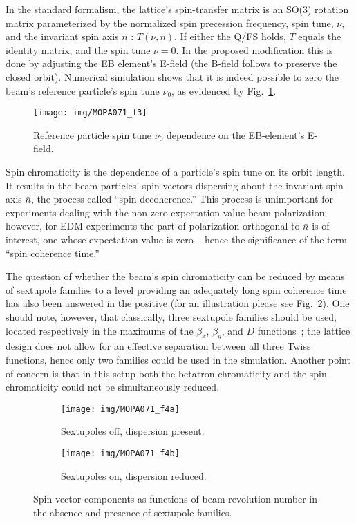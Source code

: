 \documentclass[a4paper]{jacow}
\newcommand{\barn}{\bar n}
\begin{document}
In the standard formalism, the lattice's spin-transfer matrix is an SO(3) rotation matrix parameterized by the normalized spin precession frequency, spin tune, $\nu$, and the invariant spin axis $\barn$ : $T(\nu, \barn)$. If either the Q/FS holds, $T$ equals the identity matrix, and the spin tune $\nu=0$. In the proposed modification this is done by adjusting the EB element's E-field (the B-field follows to preserve the closed orbit). Numerical simulation shows that it is indeed possible to zero the beam's reference particle's spin tune $\nu_0$, as evidenced by Fig.~\ref{fig:nu-vs-EBE}.

\begin{figure}[h]
	\texttt{[image: img/MOPA071\_f3]}
	\caption{Reference particle spin tune $\nu_0$ dependence on the EB-element's E-field.\label{fig:nu-vs-EBE}}
\end{figure}

Spin chromaticity is the dependence of a particle's spin tune on its orbit length. It results in the beam particles' spin-vectors dispersing about the invariant spin axis $\barn$, the process called ``spin decoherence.'' This process is unimportant for experiments dealing with the non-zero expectation value beam polarization; however, for EDM experiments the part of polarization orthogonal to $\barn$ is of interest, one whose expectation value is zero -- hence the significance of the term ``spin coherence time.''

The question of whether the beam's spin chromaticity can be reduced by means of sextupole families to a level providing an adequately long spin coherence time has also been answered in the positive (for an illustration please see Fig.~\ref{fig:spin-on-sext}). One should note, however, that classically, three sextupole families should be used, located respectively in the maximums of the $\beta_x$, $\beta_y$, and $D$ functions~\cite{Decoherence-main};  the lattice design does not allow for an effective separation between all three Twiss functions, hence only two families could be used in the simulation. Another point of concern is that in this setup both the betatron chromaticity and the spin chromaticity could not be simultaneously reduced.~\cite{Kolokolchikov:Coherence}

\begin{figure}[h]
	\begin{subfigure}{\linewidth}
		\texttt{[image: img/MOPA071\_f4a]}
		\caption{Sextupoles off, dispersion present.}
	\end{subfigure}
	\begin{subfigure}{\linewidth}
		\texttt{[image: img/MOPA071\_f4b]}
		\caption{Sextupoles on, dispersion reduced.}
	\end{subfigure}
	\caption{Spin vector components as functions of beam revolution number in the absence and presence of sextupole families.\label{fig:spin-on-sext}}
\end{figure}
\end{document}
